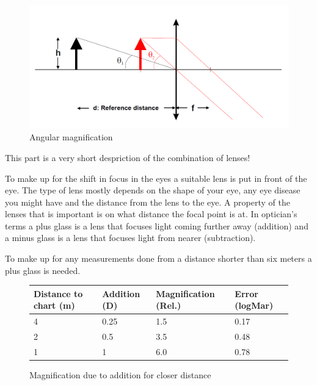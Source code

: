 \documentclass[12pt,a4paper,notitlepage]{report}
\begin{document}
\begin{figure}[ht!]
\centering
\includegraphics[width=120mm]{images/Angular_magnification.png}
\caption{Angular magnification\label{theory}}
\end{figure}

This part is a very short despriction of the combination of lenses!

To make up for the shift in focus in the eyes a suitable lens is put in front of the eye. The type of lens mostly depends on the shape of your eye, any eye disease you might have and the distance from the lens to the eye. A property of the lenses that is important is on what distance the focal point is at. In optician's terms a plus glass is a lens that focuses light coming further away (addition) and a minus glass is a lens that focuses light from nearer (subtraction). 

To make up for any measurements done from a distance shorter than six meters a plus glass is needed. \cite{PGSoderberg}

\begin{figure}[ht!]
\centering
\begin{tabular}{| l | l | l | l |}
    \hline
    Distance to chart (m) & Addition (D) & Magnification (Rel.) & Error (logMar) \\ \hline
    4                     & 0.25         & 1.5                  & 0.17           \\ \hline
    2                     & 0.5          & 3.5                  & 0.48           \\ \hline
    1                     & 1            & 6.0                  & 0.78           \\ 
    \hline
    \end{tabular}
    \caption{Magnification due to addition for closer distance\label{theory}}
\end{figure}
\end{document}
